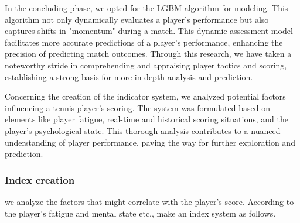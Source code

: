 \documentclass{article}
\begin{document}
In the concluding phase, we opted for the LGBM algorithm for modeling. This algorithm not only dynamically evaluates a player's performance but also captures shifts in "momentum" during a match. This dynamic assessment model facilitates more accurate predictions of a player's performance, enhancing the precision of predicting match outcomes. Through this research, we have taken a noteworthy stride in comprehending and appraising player tactics and scoring, establishing a strong basis for more in-depth analysis and prediction.

Concerning the creation of the indicator system, we analyzed potential factors influencing a tennis player's scoring. The system was formulated based on elements like player fatigue, real-time and historical scoring situations, and the player's psychological state. This thorough analysis contributes to a nuanced understanding of player performance, paving the way for further exploration and prediction.

\subsubsection{Index creation}
we analyze the factors that might correlate with the player's score. According to the player's fatigue and mental state etc., make an index system as follows.
\end{document}
